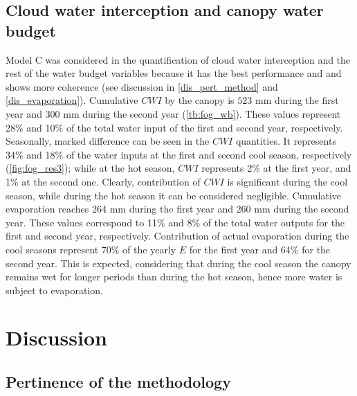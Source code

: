 \documentclass[a4paper,12pt]{article}
\begin{document}
\begin{linenumbers}
\subsection{Cloud water interception and canopy water budget}
Model C was considered in the quantification of cloud water interception and the rest of the water budget variables because it has the best performance and and shows more coherence (see discussion in \autoref{dis_pert_method} and \autoref{dis_evaporation}). Cumulative $CWI$ by the canopy is $523$ $\mathrm{{mm}}$ during the first year and $300$ $\mathrm{{mm}}$ during the second year (\autoref{tb:fog_wb}). These values represent 28\% and 10\% of the total water input of the first and second year, respectively. Seasonally, marked difference can be seen in the $CWI$ quantities. It represents 34\% and 18\% of the water inputs at the first and second cool season, respectively (\autoref{fig:fog_res3}); while at the hot season, $CWI$ represents 2\% at the first year, and 1\% at the second one. Clearly, contribution of $CWI$ is significant during the cool season, while during the hot season it can be considered negligible. Cumulative evaporation reaches 264 mm during the first year and 260 mm during the second year. These values correspond to 11\% and 8\% of the total water outputs for the first and second year, respectively. Contribution of actual evaporation during the cool seasons represent 70\%  of the yearly $E$ for the first year and 64\% for the second year. This is expected, considering that during the cool season the canopy remains wet for longer periods than during the hot season, hence more water is subject to evaporation.



\section{Discussion}

\subsection{Pertinence of the methodology} \label{dis_pert_method}


\end{linenumbers}
\end{document}

